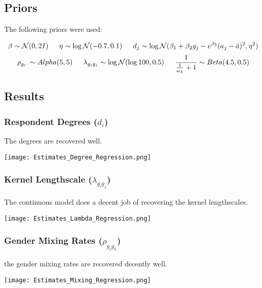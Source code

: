 \documentclass[12pt]{article}
\begin{document}
\subsection{Priors}
\noindent The following priors were used:

$$
\beta \sim \mathcal{N}(0, 2I)
\hspace{15 pt}
\eta \sim \log\mathcal{N}(-0.7, 0.1)
\hspace{15 pt}
d_j \sim \log\mathcal{N}(\beta_1 + \beta_2 g_j - e^{\beta_3} (a_j - \bar{a})^2, \eta^2)
$$
$$
\rho_{g_i\cdot} \sim Alpha(5,5)
\hspace{15 pt}
\lambda_{g_ig_j} \sim \log\mathcal{N}(\log 100, 0.5)
\hspace{15 pt}
\frac{1}{ \frac{1}{\omega_k}+1} \sim Beta(4.5,0.5)
$$

\pagebreak
\subsection{Results}
\subsubsection*{Respondent Degrees ($d_i$)}
\noindent The degrees are recovered well.

\begin{center}
\texttt{[image: Estimates\_Degree\_Regression.png]}
\end{center}

\subsubsection*{Kernel Lengthscale ($\lambda_{g_ig_j}$)}
The continuous model does a decent job of recovering the kernel lengthscales.

\begin{center}
\texttt{[image: Estimates\_Lambda\_Regression.png]}
\end{center}

\pagebreak
\subsubsection*{Gender Mixing Rates ($\rho_{g_ig_k}$)}
\noindent the gender mixing rates are recovered decently well.

\begin{center}
\texttt{[image: Estimates\_Mixing\_Regression.png]}
\end{center}
\end{document}
